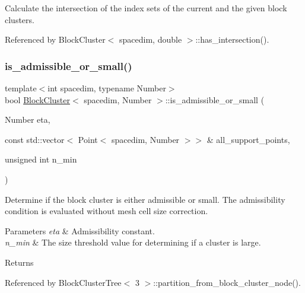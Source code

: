 Calculate the intersection of the index sets of the current and the given block clusters. 

Referenced by Block\+Cluster$<$ spacedim, double $>$\+::has\+\_\+intersection().

\mbox{\label{classBlockCluster_a3d1d12357cac0ff4df90fd576c5f2aa0}} 
\subsubsection{\texorpdfstring{is\+\_\+admissible\+\_\+or\+\_\+small()}{is\_admissible\_or\_small()}\hspace{0.1cm}{\footnotesize\ttfamily [1/2]}}
{\footnotesize\ttfamily template$<$int spacedim, typename Number$>$ \\
bool \hyperlink{classBlockCluster}{Block\+Cluster}$<$ spacedim, Number $>$\+::is\+\_\+admissible\+\_\+or\+\_\+small (\begin{DoxyParamCaption}\item[{Number}]{eta,  }\item[{const std\+::vector$<$ Point$<$ spacedim, Number $>$$>$ \&}]{all\+\_\+support\+\_\+points,  }\item[{unsigned int}]{n\+\_\+min }\end{DoxyParamCaption})}

Determine if the block cluster is either admissible or small. The admissibility condition is evaluated without mesh cell size correction.


\begin{DoxyParams}{Parameters}
{\em eta} & Admissibility constant. \\
\hline
{\em n\+\_\+min} & The size threshold value for determining if a cluster is large. \\
\hline
\end{DoxyParams}
\begin{DoxyReturn}{Returns}

\end{DoxyReturn}


Referenced by Block\+Cluster\+Tree$<$ 3 $>$\+::partition\+\_\+from\+\_\+block\+\_\+cluster\+\_\+node().

\mbox{\label{classBlockCluster_a620554d7d66beaf4dc38f166bc6dceed}} 
